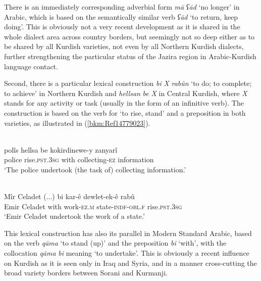 \documentclass[output=paper]{langsci/langscibook}
\begin{document}
There is an immediately corresponding adverbial form \textit{mā} \textit{ʕād} ‘no longer’ in Arabic, which is based on the semantically similar verb \textit{ʕād} ‘to return, keep doing’. This is obviously not a very recent development as it is shared in the whole dialect area across country borders, but seemingly not so deep either as to be shared by all Kurdish varieties, not even by all Northern Kurdish dialects, further strengthening the particular status of the Jazira region in Arabic-Kurdish language contact. 

Second, there is a particular lexical construction \textit{bi} \textit{X} \textit{rabûn} ‘to do; to complete; to achieve’ in Northern Kurdish and \textit{hellsan} \textit{be} \textit{X} in Central Kurdish, where \textit{X} stands for any activity or task (usually in the form of an infinitive verb). The construction is based on the verb for ‘to rise, stand’ and a preposition in both varieties, as illustrated in (\ref{bkm:Ref14779023}).

\ea\label{ex:opengin:}
\\
\gll polîs hellsa be kokirdinewe-y zanyarî\\
     police rise.\textsc{pst.3sg} with collecting-\textsc{ez} information\\
\glt ‘The police undertook (the task of) collecting information.’\z

\ea\label{ex:opengin:}
\\
\gll Mîr Celadet (...) bi kar-ê dewlet-ek-ê rabû\\
     Emir Celadet with work-\textsc{ez.m} state-\textsc{indf-obl.f} rise.\textsc{pst.3sg}       \\
\glt ‘Emir Celadet undertook the work of a state.’\z

This lexical construction has also its parallel in Modern Standard Arabic, based on the verb \textit{qāma} ‘to stand (up)’ and the preposition \textit{bi} ‘with’, with the collocation \textit{qāma} \textit{bi} meaning ‘to undertake’. This is obviously a recent influence on Kurdish as it is seen only in Iraq and Syria, and in a manner cross-cutting the broad variety borders between Sorani and Kurmanji. 
\end{document}
